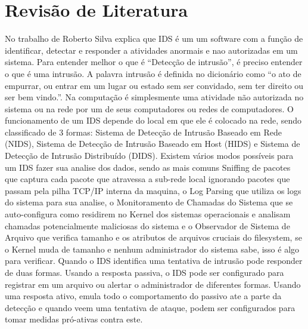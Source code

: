 \chapter[Revisão de Literatura]{Revisão de Literatura}
No trabalho de Roberto Silva \cite{RobertoSilva} explica que IDS é um um software com a função de identificar, detectar e responder a atividades anormais e nao autorizadas em um sistema. Para entender melhor o que é “Detecção de intrusão”, é preciso entender o que é uma intrusão. A palavra intrusão é definida no dicionário como “o ato de empurrar, ou entrar em um lugar ou estado sem ser convidado, sem ter direito ou ser bem vindo.”. Na computação é simplesmente uma atividade não autorizada no sistema ou na rede por um de seus computadores ou redes de computadores. O funcionamento de um IDS depende do local em que ele é colocado na rede, sendo classificado de 3 formas: Sistema de Detecção de Intrusão Baseado em Rede (NIDS), Sistema de Detecção de Intrusão Baseado em Host (HIDS) e Sistema de Detecção de Intrusão Distribuído (DIDS). 
Existem vários modos possíveis para um IDS fazer sua analise dos dados, sendo as mais comuns Sniffing de pacotes que captura cada pacote que atravessa a sub-rede local ignorando pacotes que passam pela pilha TCP/IP interna da maquina, o Log Parsing que utiliza os logs do sistema para sua analise, o Monitoramento de Chamadas do Sistema que se auto-configura como residirem no Kernel dos sistemas operacionais e analisam chamadas potencialmente maliciosas do sistema e o Observador de Sistema de Arquivo que verifica tamanho e os atributos de arquivos cruciais do filesystem, se o Kernel muda de tamanho e nenhum administrador do sistema sabe, isso é algo para verificar. 
Quando o IDS identifica uma tentativa de intrusão pode responder de duas formas. Usando a resposta passiva, o IDS pode ser configurado para registrar em um arquivo ou alertar o administrador de diferentes formas. Usando uma resposta ativo, emula todo o comportamento do passivo ate a parte da detecção e quando veem uma tentativa de ataque, podem ser configurados para tomar medidas pró-ativas contra este.

